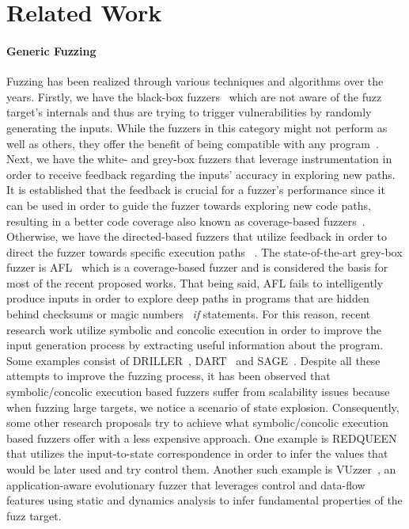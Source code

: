 \section{Related Work}
\label{sec:related}
 

\paragraph{Generic Fuzzing}
Fuzzing has been realized through various techniques and algorithms over the years. Firstly, we have the black-box 
fuzzers~\cite{woo2013scheduling,sparks2007automated,householder2012probability} which are not aware of the fuzz target's 
internals and thus are trying to trigger vulnerabilities 
by randomly generating the inputs. While the fuzzers in this category might not perform as well as others, they offer 
the benefit of being compatible with any program~\cite{rawat2017vuzzer,osterlund2020parmesan}. Next, we have 
the white- and grey-box fuzzers that leverage instrumentation in order to receive feedback regarding the inputs' 
accuracy in exploring new paths. It is established that 
the feedback is crucial for a fuzzer's performance since it can be used in order to guide the fuzzer towards exploring new code 
paths, resulting in a better code coverage also known as coverage-based fuzzers~\cite{zalewski2015american}. 
Otherwise, we have the directed-based fuzzers that utilize
feedback in order to direct the fuzzer towards specific execution paths ~\cite{godefroid2005dart}.
The state-of-the-art grey-box fuzzer is AFL~\cite{zalewski2015american} which is a coverage-based fuzzer and is considered the basis for 
most of the recent proposed works. That being said, AFL fails to intelligently produce inputs in order to explore deep paths
in programs that are hidden behind checksums or magic numbers ~\emph{if} statements. For this reason, recent research work utilize symbolic 
and concolic execution in order to improve the input generation process by extracting useful information about the program. 
Some examples consist of DRILLER~\cite{stephens2016driller}, DART~\cite{godefroid2005dart} and SAGE~\cite{godefroid2012sage}.
Despite all these attempts to improve the fuzzing process, it has been observed that symbolic/concolic execution based fuzzers suffer from
scalability issues because when fuzzing large targets, we notice a scenario of state explosion. Consequently, some other research proposals
try to achieve what symbolic/concolic execution based fuzzers offer with a less expensive approach. One example is
REDQUEEN~\cite{aschermann2019redqueen} that utilizes the input-to-state correspondence in order to infer the values that would be later
used and try control them. Another such example is VUzzer~\cite{rawat2017vuzzer}, an application-aware evolutionary fuzzer that leverages 
control and data-flow features using static and dynamics analysis to infer fundamental properties of the fuzz target. 


